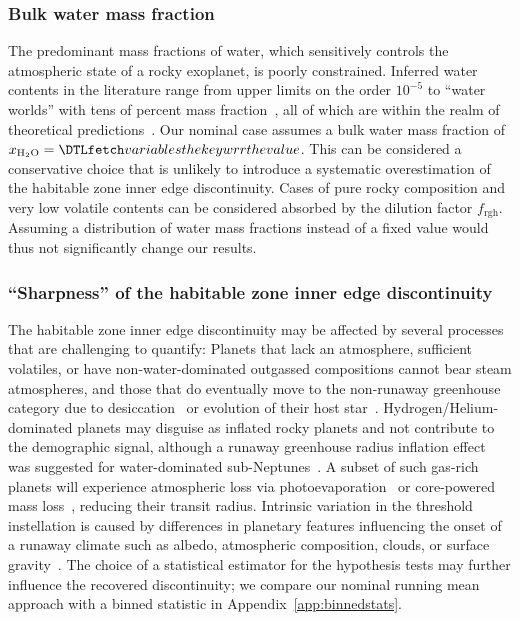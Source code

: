 \documentclass[twocolumn,twocolappendix]{aastex631}
\begin{document}
\subsubsection{Bulk water mass fraction}
The predominant mass fractions of water, which sensitively controls the atmospheric state of a rocky exoplanet, is poorly constrained.
Inferred water contents in the literature range from upper limits on the order $10^{-5}$ to ``water worlds'' with tens of percent mass fraction~\citep[e.g.,][]{Rogers2010,Unterborn2018,Mousis2020,Agol2021,Luque2022}, all of which are within the realm of theoretical predictions~\citep{Mulders2015b,Sato2016,Jin2018,Lichtenberg2019,Bitsch2019b,Venturini2020,Emsenhuber2021b,Schlecker2021,2022ApJ...938L...3L,2022ApJ...939L..19I}.
Our nominal case assumes a bulk water mass fraction of $x_\mathrm{H_2O} = \var{wrr}$.
This can be considered a conservative choice that is unlikely to introduce a systematic overestimation of the habitable zone inner edge discontinuity. %
Cases of pure rocky composition and very low volatile contents can be considered absorbed by the dilution factor $f_\mathrm{rgh}$.
Assuming a distribution of water mass fractions instead of a fixed value would thus not significantly change our results.

\subsubsection{``Sharpness'' of the habitable zone inner edge discontinuity}
The habitable zone inner edge discontinuity may be affected by several processes that are challenging to quantify:
Planets that lack an atmosphere, sufficient volatiles, or have non-water-dominated outgassed compositions cannot bear steam atmospheres, and those that do eventually move to the non-runaway greenhouse category due to desiccation~\citep[][]{Watson1981,Kasting1983,Hamano2013} or evolution of their host star~\citep{Luger2015}.
Hydrogen/Helium-dominated planets may disguise as inflated rocky planets and not contribute to the demographic signal, although a runaway greenhouse radius inflation effect was suggested for water-dominated sub-Neptunes~\citep{Pierrehumbert2022,Innes2023}.
A subset of such gas-rich planets will experience atmospheric loss via photoevaporation~\citep{Owen2013} or core-powered mass loss~\citep{Ginzburg2018}, reducing their transit radius.
Intrinsic variation in the threshold instellation is caused by differences in planetary features influencing the onset of a runaway climate such as albedo, atmospheric composition, clouds, or surface gravity~\citep{Salvador2017,Turbet2021,Lichtenberg2021c,Pierrehumbert2022,Innes2023}.
The choice of a statistical estimator for the hypothesis tests may further influence the recovered discontinuity; we compare our nominal running mean approach with a binned statistic in Appendix~\ref{app:binnedstats}.
\end{document}
